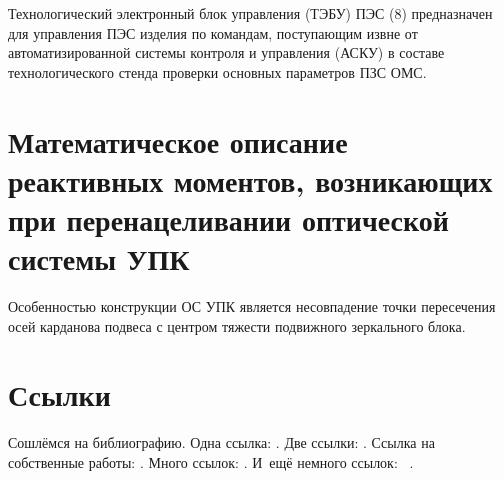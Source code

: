 Технологический электронный блок управления (ТЭБУ) ПЭС (8) предназначен для управления ПЭС изделия по командам, поступающим извне от автоматизированной системы контроля и управления (АСКУ) в составе технологического стенда проверки основных параметров ПЗС ОМС.


\section{Математическое описание реактивных моментов, возникающих при перенацеливании оптической системы УПК}\label{sec:ch1/sec2}

Особенностью конструкции ОС УПК является несовпадение точки пересечения осей карданова подвеса с центром тяжести подвижного зеркального блока.

\section{Ссылки}\label{sec:ch1/sec2}

Сошлёмся на библиографию.
Одна ссылка: \cite[с.~54]{Sokolov}\cite[с.~36]{Gaidaenko}.
Две ссылки: \cite{Sokolov,Gaidaenko}.
Ссылка на собственные работы: \cite{vakbib1, confbib2}.
Много ссылок: %
\cite{Lermontov, Management, Borozda, Marketing, Constitution, FamilyCode,
    Gost.7.0.53, Razumovski, Lagkueva, Pokrovski, Methodology, Berestova,
    Kriger}%
%
.
И~ещё немного ссылок:~\cite{Article,Book,Booklet,Conference,Inbook,Incollection,Manual,Mastersthesis,
    Misc,Phdthesis,Proceedings,Techreport,Unpublished}
\cite{medvedev2006jelektronnye, CEAT:CEAT581, doi:10.1080/01932691.2010.513279,
    Gosele1999161,Li2007StressAnalysis, Shoji199895, test:eisner-sample,
    test:eisner-sample-shorted, AB_patent_Pomerantz_1968, iofis_patent1960}%
%
.


